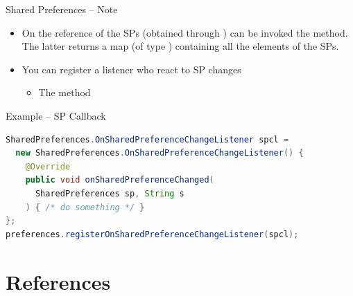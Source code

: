 \documentclass{beamer}
\begin{document}
  \begin{frame}[fragile]{Shared Preferences -- Note}
    \begin{itemize}\itemsep10pt
      \item On the reference of the SPs (obtained through
      ) can be invoked the 
      method. The latter returns a map (of type )
      containing all the elements of the SPs.
      \item You can register a listener who react to SP changes 
      \begin{itemize}
        \item The  method
      \end{itemize}
    \end{itemize}
    \begin{exampleblock}{Example -- SP Callback}
      \begin{lstlisting}[language=Java]  		        
SharedPreferences.OnSharedPreferenceChangeListener spcl =
  new SharedPreferences.OnSharedPreferenceChangeListener() {
    @Override
    public void onSharedPreferenceChanged(
      SharedPreferences sp, String s
    ) { /* do something */ }
};
preferences.registerOnSharedPreferenceChangeListener(spcl);
      \end{lstlisting}
    \end{exampleblock}
  \end{frame}

\section*{References}


\end{document}
